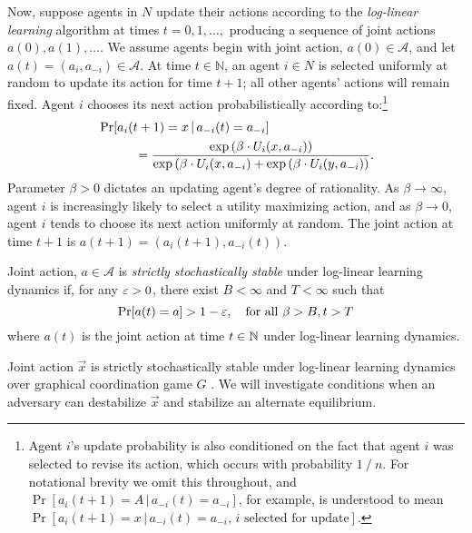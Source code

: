 Now, suppose agents in $N$ update their actions according to the \emph{log-linear learning} algorithm at times $t = 0,1,\ldots,$ producing a sequence of joint actions $a(0),a(1),\ldots$. We assume agents begin with joint action, $a(0)\in\mathcal{A}$, and let $a(t) = (a_i,a_{-i})\in\mathcal{A}.$  At time $t\in\mathbb{N}$, an agent $i\in N$ is selected uniformly at random to update its action for time $t+1$; all other agents' actions will remain fixed. Agent $i$ chooses its next action probabilistically according to:\footnote{Agent $i$'s update probability is also conditioned on the fact that agent $i$ was selected to revise its action, which occurs with probability $1\mathop{/}n$. For notational brevity we omit this throughout, and  $\Pr[a_i(t+1) = A\,|\, a_{-i}(t) = a_{-i}]$, for example, is understood to mean $\Pr[a_i(t+1) = x\,|\, a_{-i}(t) = a_{-i},\, i \text{ selected for update}].$}
\begin{align}
&\Pr[a_i(t+1) = x\,|\, a_{-i}(t) = a_{-i}]\nonumber \\
&\hspace{.4in}= {\exp \left(\beta \cdot U_i(x,a_{-i})\right)\over \exp \left(\beta \cdot  U_i(x,a_{-i}\right)+\exp \left(\beta \cdot U_i(y,a_{-i})\right)}.\label{e:LLL dynamics}
\end{align} 
Parameter $\beta>0$ dictates an updating agent's degree of rationality. %
As $\beta\to \infty$, agent $i$ is increasingly likely to select a utility maximizing action, and as $\beta\to 0$, agent $i$ tends to choose its next action uniformly at random.
The joint action at time $t+1$ is
$a(t+1) = (a_i(t+1),a_{-i}(t)).$


Joint action, $a\in\mathcal{A}$ is \emph{strictly stochastically stable} \cite{Foster1990} under log-linear learning dynamics if, for any $\eps >0$, there exist $B<\infty$ and $T<\infty$ such that
\begin{equation}
\Pr[a(t)=a] > 1-\eps,\quad\text{for all } \beta > B, t>T
\end{equation}
where $a(t)$ is the joint action at time $t\in\N$ under log-linear learning dynamics.

Joint action $\vec{x}$ is strictly stochastically stable under log-linear learning dynamics over graphical coordination game $G$ \cite{Blume1993}. We will investigate conditions when an adversary can destabilize $\vec{x}$ and stabilize an alternate equilibrium.



